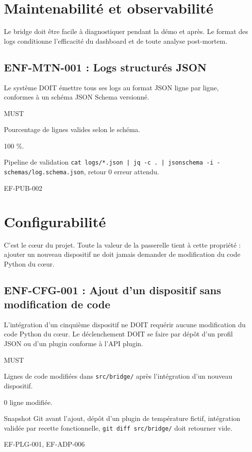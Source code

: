 \section{Maintenabilité et observabilité}
\label{sec:enf-maintenabilite}

Le bridge doit être facile à diagnostiquer pendant la démo et après. Le format des logs conditionne l'efficacité du dashboard et de toute analyse post-mortem.

\subsection*{ENF-MTN-001 : Logs structurés JSON}
\begin{description}[leftmargin=2.5cm, style=nextline]
  \item[Énoncé] Le système DOIT émettre tous ses logs au format JSON ligne par ligne, conformes à un schéma JSON Schema versionné.
  \item[Priorité] MUST
  \item[Métrique] Pourcentage de lignes valides selon le schéma.
  \item[Cible] 100 \%.
  \item[Mesure] Pipeline de validation \texttt{cat logs/*.json | jq -c . | jsonschema -i - schemas/log.schema.json}, retour 0 erreur attendu.
  \item[Lié à] EF-PUB-002
\end{description}

\section{Configurabilité}
\label{sec:enf-configurabilite}

C'est le cœur du projet. Toute la valeur de la passerelle tient à cette propriété : ajouter un nouveau dispositif ne doit jamais demander de modification du code Python du cœur.

\subsection*{ENF-CFG-001 : Ajout d'un dispositif sans modification de code}
\begin{description}[leftmargin=2.5cm, style=nextline]
  \item[Énoncé] L'intégration d'un cinquième dispositif ne DOIT requérir aucune modification du code Python du cœur. Le déclenchement DOIT se faire par dépôt d'un profil JSON ou d'un plugin conforme à l'API plugin.
  \item[Priorité] MUST
  \item[Métrique] Lignes de code modifiées dans \texttt{src/bridge/} après l'intégration d'un nouveau dispositif.
  \item[Cible] 0 ligne modifiée.
  \item[Mesure] Snapshot Git avant l'ajout, dépôt d'un plugin de température fictif, intégration validée par recette fonctionnelle, \texttt{git diff src/bridge/} doit retourner vide.
  \item[Lié à] EF-PLG-001, EF-ADP-006
\end{description}

